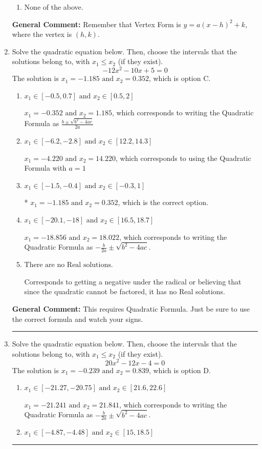 \documentclass{extbook}[14pt]
\newcommand{\litem}[1]{\item #1

\rule{\textwidth}{0.4pt}}
\begin{document}
\begin{enumerate}
{\begin{enumerate}[label=\Alph*.]
\begin{multicols}{2}
\end{multicols}\item None of the above.\end{enumerate}
\textbf{General Comment:} Remember that Vertex Form is $y = a(x-h)^2+k$, where the vertex is $(h, k)$.
}
\litem{
Solve the quadratic equation below. Then, choose the intervals that the solutions belong to, with $x_1 \leq x_2$ (if they exist).
\[ -12x^{2} -10 x + 5 = 0 \]The solution is \( x_1 = -1.185 \text{ and } x_2 = 0.352 \), which is option C.\begin{enumerate}[label=\Alph*.]
\item \( x_1 \in [-0.5, 0.7] \text{ and } x_2 \in [0.5, 2] \)

 $x_1 = -0.352 \text{ and } x_2 = 1.185$, which corresponds to writing the Quadratic Formula as $\frac{b \pm \sqrt{b^2 - 4ac}}{2a}$
\item \( x_1 \in [-6.2, -2.8] \text{ and } x_2 \in [12.2, 14.3] \)

 $x_1 = -4.220 \text{ and } x_2 = 14.220$, which corresponds to using the Quadratic Formula with $a=1$
\item \( x_1 \in [-1.5, -0.4] \text{ and } x_2 \in [-0.3, 1] \)

* $x_1 = -1.185 \text{ and } x_2 = 0.352$, which is the correct option.
\item \( x_1 \in [-20.1, -18] \text{ and } x_2 \in [16.5, 18.7] \)

 $x_1 = -18.856 \text{ and } x_2 = 18.022$, which corresponds to writing the Quadratic Formula as $-\frac{b}{2a} \pm \sqrt{b^2 - 4ac}$.
\item \( \text{There are no Real solutions.} \)

Corresponds to getting a negative under the radical or believing that since the quadratic cannot be factored, it has no Real solutions.
\end{enumerate}

\textbf{General Comment:} This requires Quadratic Formula. Just be sure to use the correct formula and watch your signs.
}
\litem{
Solve the quadratic equation below. Then, choose the intervals that the solutions belong to, with $x_1 \leq x_2$ (if they exist).
\[ 20x^{2} -12 x -4 = 0 \]The solution is \( x_1 = -0.239 \text{ and } x_2 = 0.839 \), which is option D.\begin{enumerate}[label=\Alph*.]
\item \( x_1 \in [-21.27, -20.75] \text{ and } x_2 \in [21.6, 22.6] \)

 $x_1 = -21.241 \text{ and } x_2 = 21.841$, which corresponds to writing the Quadratic Formula as $-\frac{b}{2a} \pm \sqrt{b^2 - 4ac}$.
\item \( x_1 \in [-4.87, -4.48] \text{ and } x_2 \in [15, 18.5] \)


\end{enumerate}}
\end{enumerate}
\end{document}

